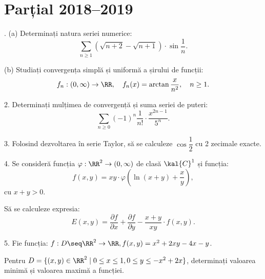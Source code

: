
\chapter{Parțial 2018--2019}

\indent{}. (a) Determinați natura seriei numerice:
\[
  \sum_{n \geq 1} \left( \sqrt{n + 2} - \sqrt{n + 1}\right) \cdot \sin \dfrac{1}{n}.
\]

(b) Studiați convergența simplă și uniformă a șirului de funcții:
\[
  f_n : (0, \infty) \to \RR, \quad f_n(x) = \arctan \dfrac{x}{n^2}, \quad n \geq 1.
\]

\vspace{0.5cm}

2. Determinați mulțimea de convergență și suma seriei de puteri:
\[
  \sum_{n \geq 0} (-1)^n \dfrac{1}{n!} \cdot \dfrac{x^{2n-1}}{5^n}.
\]

\vspace{0.5cm}

3. Folosind dezvoltarea în serie Taylor, să se calculeze $ \cos \dfrac{1}{2} $
cu 2 zecimale exacte.

\vspace{0.5cm}

4. Se consideră funcția $ \varphi : \RR^2 \to (0, \infty) $ de clasă $ \kal{C}^1 $
și funcția:
\[
  f(x, y) = xy \cdot \varphi \left( \ln(x + y) + \dfrac{x}{y} \right),
\]
cu $ x + y > 0 $.

Să se calculeze expresia:
\[
  E(x, y) = \dfrac{\partial f}{\partial x} + \dfrac{\partial f}{\partial y} - %
  \dfrac{x + y}{xy} \cdot f(x, y).
\]

\vspace{0.5cm}

5. Fie funcția: $ f : D \seq \RR^2 \to \RR, f(x, y) = x^2 + 2xy - 4x - y $.

Pentru $ D = \{ (x, y) \in \RR^2 \mid 0 \leq x \leq 1, 0 \leq y \leq -x^2 + 2x \} $,
determinați valoarea minimă și valoarea maximă a funcției.


